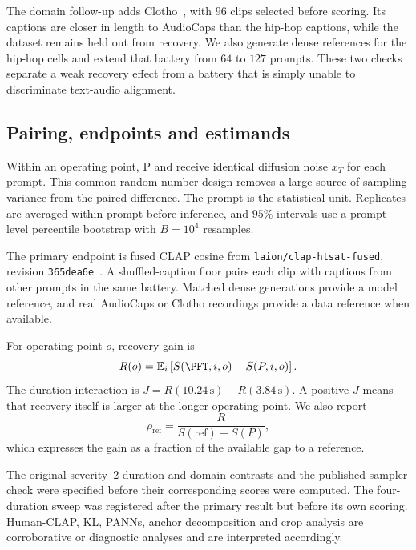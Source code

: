 The domain follow-up adds Clotho~\cite{drossos2020clotho}, with $96$ clips selected before scoring. Its captions are closer in length to AudioCaps than the hip-hop captions, while the dataset remains held out from recovery. We also generate dense references for the hip-hop cells and extend that battery from $64$ to $127$ prompts. These two checks separate a weak recovery effect from a battery that is simply unable to discriminate text-audio alignment.

\subsection{Pairing, endpoints and estimands}
Within an operating point, P and \PFT{} receive identical diffusion noise $x_T$ for each prompt. This common-random-number design removes a large source of sampling variance from the paired difference. The prompt is the statistical unit. Replicates are averaged within prompt before inference, and $95\%$ intervals use a prompt-level percentile bootstrap with $B=10^{4}$ resamples.

The primary endpoint is fused CLAP cosine from \texttt{laion/\allowbreak clap-htsat-fused}, revision \texttt{365dea6e}~\cite{wu2023clap}. A shuffled-caption floor pairs each clip with captions from other prompts in the same battery. Matched dense generations provide a model reference, and real AudioCaps or Clotho recordings provide a data reference when available.

For operating point $o$, recovery gain is
\begin{equation}
R(o)=\mathbb{E}_{i}\left[S(\PFT,i,o)-S(P,i,o)\right].
\end{equation}
The duration interaction is $J=R(10.24\,\mathrm{s})-R(3.84\,\mathrm{s})$. A positive $J$ means that recovery itself is larger at the longer operating point. We also report
\begin{equation}
\rho_{\mathrm{ref}}=\frac{R}{S(\mathrm{ref})-S(P)},
\end{equation}
which expresses the gain as a fraction of the available gap to a reference.

The original severity~2 duration and domain contrasts and the published-sampler check were specified before their corresponding scores were computed. The four-duration sweep was registered after the primary result but before its own scoring. Human-CLAP, KL, PANNs, anchor decomposition and crop analysis are corroborative or diagnostic analyses and are interpreted accordingly.

